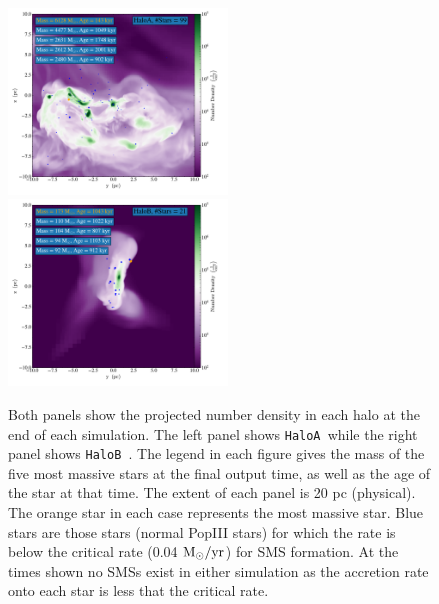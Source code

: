 \documentclass[graphics, twocolumn, usenatbib]{mn2e}
\newcommand{\msolaryrc} {$\rm{M_{\odot}/yr}$}
\newcommand{\ha} {\texttt{HaloA~}}
\newcommand{\hb} {\texttt{HaloB~}}
\begin{document}
\begin{figure}
\centering
\begin{minipage}{175mm}      \begin{center} 
\centerline{
\includegraphics[width=0.52\textwidth]{FIGURES/HaloA/Proj_z_number_density_2001.pdf}
\includegraphics[width=0.52\textwidth]{FIGURES/HaloB/Proj_z_number_density_1103.pdf}}
\caption{Both panels show the projected number density in each halo at the end of each simulation. The
  left panel shows \ha while the right panel shows \hb.
  The legend in each figure gives the mass of the five most massive stars at the final output time, as well as
  the age of the star at that time. The extent of each panel is 20 pc (physical). The orange
  star in each case represents the most massive star. Blue stars are those stars (normal PopIII stars) for
  which the rate is below the critical rate (0.04 \msolaryrc) for SMS formation. At the times shown no
  SMSs exist in either simulation
  as the accretion rate onto each star is less that the critical rate. }  \label{Fig:ProjectionEnd}
\end{center} \end{minipage}

\end{figure}
\end{document}
